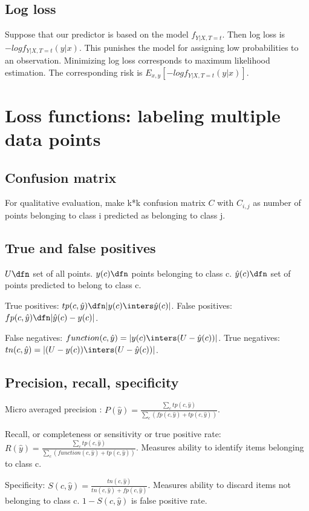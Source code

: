 \documentclass[oneside, article]{memoir}
\begin{document}
\subsection{Log loss}
Suppose that our predictor is based on the model $f_{Y|X,T=t}$. Then log loss is $-log f_{Y|X,T=t}(y|x)$. This punishes the model for assigning low probabilities to an observation. Minimizing log loss corresponds to maximum likelihood estimation. The corresponding risk is $E_{x, y}[-log f_{Y|X,T=t}(y|x)]$.

\section{Loss functions: labeling multiple data points}
\subsection{Confusion matrix}
For qualitative evaluation, make k*k confusion matrix $C$ with $C_{i,j}$ as number of points belonging to class i predicted as belonging to class j.

\subsection{True and false positives}
$U \dfn $ set of all points. $y(c) \dfn$ points belonging to class c. $\hat{y}(c) \dfn$ set of points predicted to belong to class c.

True positives: $tp(c, \hat{y}) \dfn |y(c) \inters \hat{y}(c)|$. False positives: $fp(c, \hat{y}) \dfn |\hat{y}(c) - y(c)|$.

False negatives: $function(c, \hat{y}) = |y(c) \inters (U - \hat{y}(c))|$. True negatives: $tn(c, \hat{y}) = |(U - y(c)) \inters (U - \hat{y}(c))|$.

\subsection{Precision, recall, specificity}
Micro averaged precision : $P(\hat{y}) = \frac{\sum_{c}tp(c, \hat{y})}{\sum_{c} (fp(c, \hat{y})+tp(c, \hat{y}))}$.

Recall, or completeness or sensitivity or true positive rate:\\ $R(\hat{y}) = \frac{\sum_{c}tp(c, \hat{y})}{\sum_{c} (function(c, \hat{y}) + tp(c, \hat{y}))}$. Measures ability to identify items belonging to class c.

Specificity: $S(c, \hat{y}) = \frac{tn(c, \hat{y})}{tn(c, \hat{y}) + fp(c, \hat{y})}$. Measures ability to discard items not belonging to class c. $1 - S(c, \hat{y})$ is false positive rate.
\end{document}
